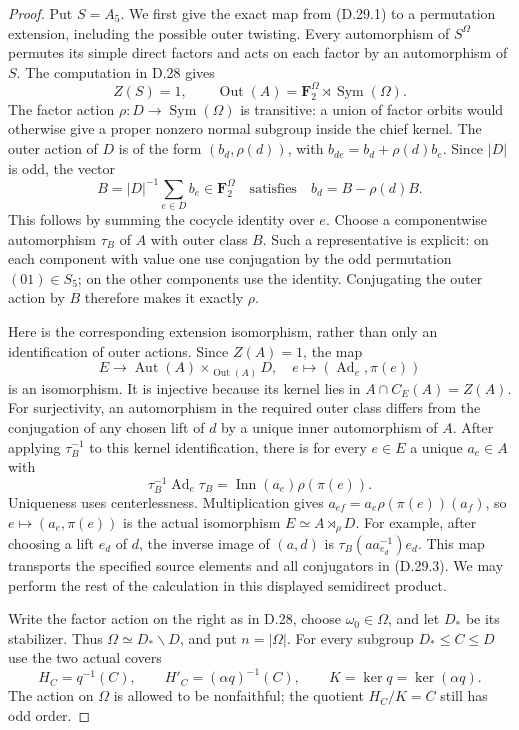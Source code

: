 \begin{proof}
Put $S=A_5$.  We first give the exact map from
\textup{(D.29.1)} to a permutation extension, including
the possible outer twisting.  Every automorphism of
$S^{\Omega}$ permutes its simple direct factors and
acts on each factor by an automorphism of $S$.
The computation in D.28 gives
\[
 Z(S)=1,\qquad
 \operatorname{Out}(A)=\mathbf F_2^{\Omega}
                         \rtimes\operatorname{Sym}(\Omega).
 \tag{D.29.4}
\]
The factor action $\rho:D\to\operatorname{Sym}(\Omega)$
is transitive: a union of factor orbits would otherwise
give a proper nonzero normal subgroup inside the chief
kernel.  The outer action of $D$ is of the form
$(b_d,\rho(d))$, with
$b_{de}=b_d+\rho(d)b_e$.
Since $|D|$ is odd, the vector
\[
 B=|D|^{-1}\sum_{e\in D}b_e\in\mathbf F_2^{\Omega}
 \quad\text{satisfies}\quad b_d=B-\rho(d)B.
 \tag{D.29.5}
\]
This follows by summing the cocycle identity over $e$.
Choose a componentwise automorphism $\tau_B$ of $A$
with outer class $B$.  Such a representative is explicit:
on each component with value one use conjugation by the
odd permutation $(01)\in S_5$; on the other components
use the identity.  Conjugating the outer action by $B$
therefore makes it exactly $\rho$.

Here is the corresponding extension isomorphism, rather
than only an identification of outer actions.  Since
$Z(A)=1$, the map
\[
 E\longrightarrow\operatorname{Aut}(A)
                       \times_{\operatorname{Out}(A)}D,
       \quad e\longmapsto(\operatorname{Ad}_e,\pi(e))
 \tag{D.29.6}
\]
is an isomorphism.  It is injective because its kernel
lies in $A\cap C_E(A)=Z(A)$.  For surjectivity, an
automorphism in the required outer class differs from
the conjugation of any chosen lift of $d$ by a unique
inner automorphism of $A$.
After applying $\tau_B^{-1}$ to this kernel identification,
there is for every $e\in E$ a unique $a_e\in A$ with
\[
 \tau_B^{-1}\operatorname{Ad}_e\tau_B
              =\operatorname{Inn}(a_e)\rho(\pi(e)).
 \tag{D.29.7}
\]
Uniqueness uses centerlessness.  Multiplication gives
$a_{ef}=a_e\rho(\pi(e))(a_f)$, so
$e\mapsto(a_e,\pi(e))$ is the actual isomorphism
$E\simeq A\rtimes_\rho D$.  For example, after choosing
a lift $e_d$ of $d$, the inverse image of $(a,d)$ is
$\tau_B(a a_{e_d}^{-1})e_d$.
This map transports the specified source elements and
all conjugators in \textup{(D.29.3)}.  We may perform
the rest of the calculation in this displayed
semidirect product.

Write the factor action on the right as in D.28,
choose $\omega_0\in\Omega$, and let $D_*$ be its
stabilizer.  Thus $\Omega\simeq D_*\backslash D$,
and put $n=|\Omega|$.  For every subgroup
$D_*\leq C\leq D$ use the two actual covers
\[
 H_C=q^{-1}(C),\qquad
 H'_C=(\alpha q)^{-1}(C),\qquad
 K=\ker q=\ker(\alpha q).
 \tag{D.29.8}
\]
The action on $\Omega$ is allowed to be nonfaithful;
the quotient $H_C/K=C$ still has odd order.


\end{proof}
